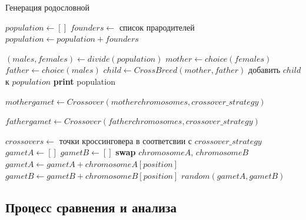\documentclass{matmex-diploma-custom}
\begin{document}
\begin{algorithm}
  \caption{Генерация родословной}
  \label{algo:pedigen}
  \begin{algorithmic}[1]
    \State $\mathit{population} \gets []$
    \State $\mathit{founders} \gets$ список прародителей
    \State $\mathit{population} \gets \mathit{population} + \mathit{founders}$

    \State $(\mathit{males}, \mathit{females}) \gets \mathit{divide}(\mathit{population})$
    \State $\mathit{mother} \gets \mathit{choice}(\mathit{females})$
    \State $\mathit{father} \gets \mathit{choice}(\mathit{males})$
    \State $\mathit{child} \gets \mathit{CrossBreed}(\mathit{mother}, \mathit{father})$
    \State добавить $\mathit{child}$ к $\mathit{population}$
    \EndFor
    \State \textbf{print} population
    \EndProcedure

    \State

    \State $\mathit{mother} \mathit{gamet} \gets
    \mathit{Crossover}(\mathit{mother} \mathit{chromosomes}, \mathit{crossover\_strategy})$

    \State $\mathit{father} \mathit{gamet} \gets
    \mathit{Crossover}(\mathit{father} \mathit{chromosomes}, \mathit{crossover\_strategy})$
    \EndFunction

    \State

    \State $\mathit{crossovers} \gets $ точки кроссинговера в
    соответсвии с $\mathit{crossover\_strategy}$
    \State $\mathit{gametA} \gets []$
    \State $\mathit{gametB} \gets []$
    \State \textbf{swap} $\mathit{chromosomeA}$, $\mathit{chromosomeB}$
    \State $\mathit{gametA} \gets \mathit{gametA} + \mathit{chromosomeA}[\mathit{position}]$
    \State $\mathit{gametB} \gets \mathit{gametB} + \mathit{chromosomeB}[\mathit{position}]$
    \EndIf
    \EndFor
    \State \Return $\mathit{random}(\mathit{gametA}, \mathit{gametB})$
    \EndFunction
  \end{algorithmic}
\end{algorithm}

\subsection{Процесс сравнения и анализа}
\end{document}
